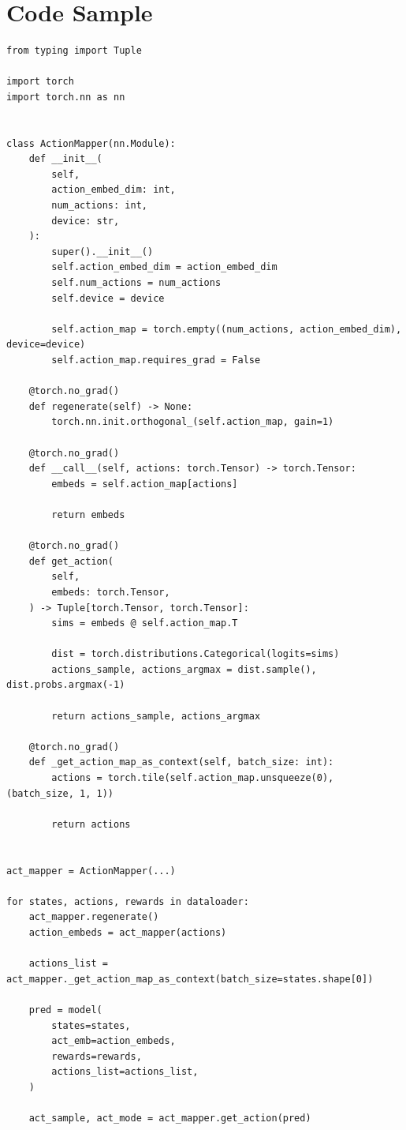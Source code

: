 \clearpage
\section{Code Sample}
\label{appendix:pseudo_code}

\begin{listing}[h!]
\begin{tcolorbox}[left*=1.5mm, size=fbox, colback=mygray, boxrule=0.1pt]
\begin{verbatim}
from typing import Tuple

import torch
import torch.nn as nn


class ActionMapper(nn.Module):
    def __init__(
        self,
        action_embed_dim: int,
        num_actions: int,
        device: str,
    ):
        super().__init__()
        self.action_embed_dim = action_embed_dim
        self.num_actions = num_actions
        self.device = device

        self.action_map = torch.empty((num_actions, action_embed_dim), device=device)
        self.action_map.requires_grad = False

    @torch.no_grad()
    def regenerate(self) -> None:
        torch.nn.init.orthogonal_(self.action_map, gain=1)

    @torch.no_grad()
    def __call__(self, actions: torch.Tensor) -> torch.Tensor:
        embeds = self.action_map[actions]

        return embeds

    @torch.no_grad()
    def get_action(
        self,
        embeds: torch.Tensor,
    ) -> Tuple[torch.Tensor, torch.Tensor]:
        sims = embeds @ self.action_map.T

        dist = torch.distributions.Categorical(logits=sims)
        actions_sample, actions_argmax = dist.sample(), dist.probs.argmax(-1)

        return actions_sample, actions_argmax

    @torch.no_grad()
    def _get_action_map_as_context(self, batch_size: int):
        actions = torch.tile(self.action_map.unsqueeze(0), (batch_size, 1, 1))

        return actions


act_mapper = ActionMapper(...)

for states, actions, rewards in dataloader:
    act_mapper.regenerate()
    action_embeds = act_mapper(actions)

    actions_list = act_mapper._get_action_map_as_context(batch_size=states.shape[0])

    pred = model(
        states=states,
        act_emb=action_embeds,
        rewards=rewards,
        actions_list=actions_list,
    )

    act_sample, act_mode = act_mapper.get_action(pred)
\end{verbatim}
\end{tcolorbox}
\label{fig:code_sample}
\caption{Code that demonstrates the Headless-AD training procedure. Note that this snippet is intended for illustration purposes only. The complete code can be found in Headless-AD's repository.}
\end{listing}